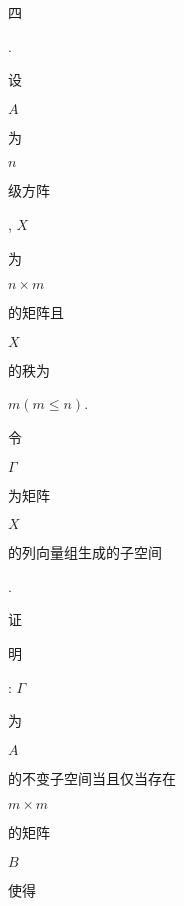 \documentclass[10pt]{article}
\begin{document}
\begin{CJK}{UTF8}{mj}四\end{CJK}. \begin{CJK}{UTF8}{mj}设\end{CJK} $A$ \begin{CJK}{UTF8}{mj}为\end{CJK} $n$ \begin{CJK}{UTF8}{mj}级方阵\end{CJK}, $X$ \begin{CJK}{UTF8}{mj}为\end{CJK} $n \times m$ \begin{CJK}{UTF8}{mj}的矩阵且\end{CJK} $X$ \begin{CJK}{UTF8}{mj}的秩为\end{CJK} $m(m \leqslant n)$. \begin{CJK}{UTF8}{mj}令\end{CJK} $\Gamma$ \begin{CJK}{UTF8}{mj}为矩阵\end{CJK} $X$ \begin{CJK}{UTF8}{mj}的列向量组生成的子空间\end{CJK}. \begin{CJK}{UTF8}{mj}证\end{CJK} \begin{CJK}{UTF8}{mj}明\end{CJK}: $\Gamma$ \begin{CJK}{UTF8}{mj}为\end{CJK} $A$ \begin{CJK}{UTF8}{mj}的不变子空间当且仅当存在\end{CJK} $m \times m$ \begin{CJK}{UTF8}{mj}的矩阵\end{CJK} $B$ \begin{CJK}{UTF8}{mj}使得\end{CJK}
\end{document}

